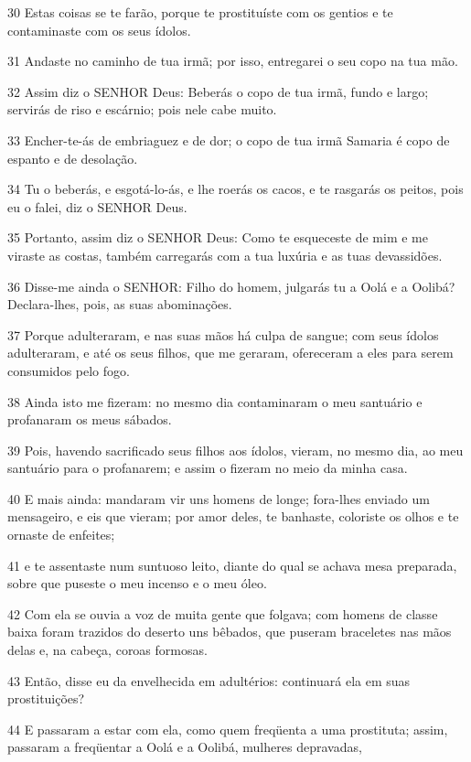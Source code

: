 \par 30 Estas coisas se te farão, porque te prostituíste com os gentios e te contaminaste com os seus ídolos.
\par 31 Andaste no caminho de tua irmã; por isso, entregarei o seu copo na tua mão.
\par 32 Assim diz o SENHOR Deus: Beberás o copo de tua irmã, fundo e largo; servirás de riso e escárnio; pois nele cabe muito.
\par 33 Encher-te-ás de embriaguez e de dor; o copo de tua irmã Samaria é copo de espanto e de desolação.
\par 34 Tu o beberás, e esgotá-lo-ás, e lhe roerás os cacos, e te rasgarás os peitos, pois eu o falei, diz o SENHOR Deus.
\par 35 Portanto, assim diz o SENHOR Deus: Como te esqueceste de mim e me viraste as costas, também carregarás com a tua luxúria e as tuas devassidões.
\par 36 Disse-me ainda o SENHOR: Filho do homem, julgarás tu a Oolá e a Oolibá? Declara-lhes, pois, as suas abominações.
\par 37 Porque adulteraram, e nas suas mãos há culpa de sangue; com seus ídolos adulteraram, e até os seus filhos, que me geraram, ofereceram a eles para serem consumidos pelo fogo.
\par 38 Ainda isto me fizeram: no mesmo dia contaminaram o meu santuário e profanaram os meus sábados.
\par 39 Pois, havendo sacrificado seus filhos aos ídolos, vieram, no mesmo dia, ao meu santuário para o profanarem; e assim o fizeram no meio da minha casa.
\par 40 E mais ainda: mandaram vir uns homens de longe; fora-lhes enviado um mensageiro, e eis que vieram; por amor deles, te banhaste, coloriste os olhos e te ornaste de enfeites;
\par 41 e te assentaste num suntuoso leito, diante do qual se achava mesa preparada, sobre que puseste o meu incenso e o meu óleo.
\par 42 Com ela se ouvia a voz de muita gente que folgava; com homens de classe baixa foram trazidos do deserto uns bêbados, que puseram braceletes nas mãos delas e, na cabeça, coroas formosas.
\par 43 Então, disse eu da envelhecida em adultérios: continuará ela em suas prostituições?
\par 44 E passaram a estar com ela, como quem freqüenta a uma prostituta; assim, passaram a freqüentar a Oolá e a Oolibá, mulheres depravadas,
